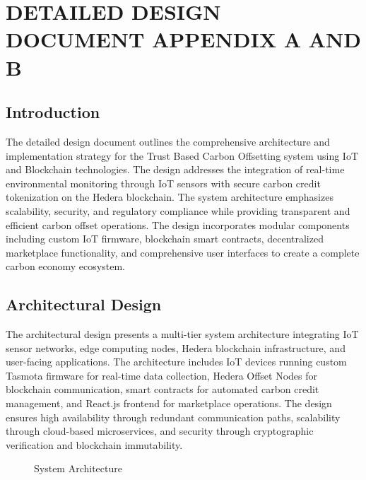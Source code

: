 \documentclass[oneside,a4paper,12pt]{book}
\begin{document}
\chapter{DETAILED DESIGN DOCUMENT APPENDIX A AND B}
\newpage

\section{Introduction}  
The detailed design document outlines the comprehensive architecture and implementation strategy for the Trust Based Carbon Offsetting system using IoT and Blockchain technologies. The design addresses the integration of real-time environmental monitoring through IoT sensors with secure carbon credit tokenization on the Hedera blockchain. The system architecture emphasizes scalability, security, and regulatory compliance while providing transparent and efficient carbon offset operations. The design incorporates modular components including custom IoT firmware, blockchain smart contracts, decentralized marketplace functionality, and comprehensive user interfaces to create a complete carbon economy ecosystem.

\section{Architectural Design}  
The architectural design presents a multi-tier system architecture integrating IoT sensor networks, edge computing nodes, Hedera blockchain infrastructure, and user-facing applications. The architecture includes IoT devices running custom Tasmota firmware for real-time data collection, Hedera Offset Nodes for blockchain communication, smart contracts for automated carbon credit management, and React.js frontend for marketplace operations. The design ensures high availability through redundant communication paths, scalability through cloud-based microservices, and security through cryptographic verification and blockchain immutability.


\begin{center}
    \begin{figure}[!htbp]
        \centering
      \caption{System Architecture}
      \label{fig:usecase}
    \end{figure}
\end{center}  
\end{document}
